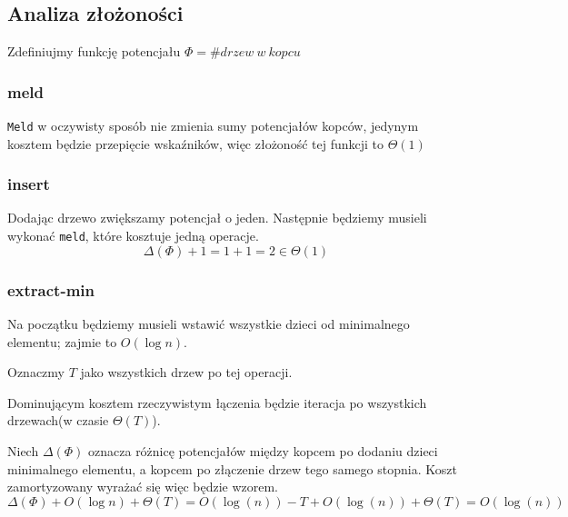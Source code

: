 \subsection{Analiza złożoności}
Zdefiniujmy funkcję potencjału $\Phi = \#drzew~w~kopcu$
\subsubsection{meld}
\texttt{Meld} w oczywisty sposób nie zmienia sumy potencjałów kopców, jedynym kosztem będzie przepięcie wskaźników, więc złożoność tej funkcji to $\Theta(1)$
\subsubsection{insert}
Dodając drzewo zwiększamy potencjał o jeden.
Następnie będziemy musieli wykonać \texttt{meld}, które kosztuje jedną operacje.
\[
  \Delta(\Phi) + 1 = 1 + 1 = 2 \in \Theta(1)
\]
\subsubsection{extract-min}
Na początku będziemy musieli wstawić wszystkie dzieci od minimalnego elementu; zajmie to $O(\log n)$.

Oznaczmy $T$ jako wszystkich drzew po tej operacji.

Dominującym kosztem rzeczywistym łączenia będzie iteracja po wszystkich drzewach(w czasie $\Theta(T)$).

Niech $\Delta(\Phi)$ oznacza różnicę potencjałów między kopcem po dodaniu dzieci minimalnego elementu, a kopcem po złączenie drzew tego samego stopnia.
Koszt zamortyzowany wyrażać się więc będzie wzorem.
\[
  \Delta(\Phi) + O(\log n) + \Theta(T) = O(\log(n)) - T + O(\log(n)) + \Theta(T) = O(\log(n))
\]

